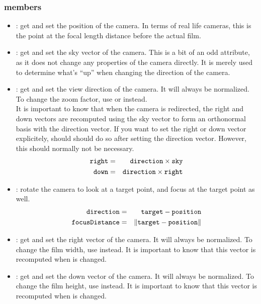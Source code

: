 \subsubsection*{members}
\begin{itemize}
	\item {}:
		get and set the position of the camera.  In terms of real life cameras, this is the point at the focal length distance before the actual film.
		
 	\item {}:
 	  get and set the sky vector of the camera.  This is a bit of an odd attribute, as it does not change any properties of the camera directly.  It is merely used to determine what's ``up'' when changing the direction of the camera.
 	  
	\item {}:
		get and set the view direction of the camera.  It will always be normalized.  To change the zoom factor, use  or  instead.\\
		It is important to know that when the camera is redirected, the right and down vectors are recomputed using the sky vector to form an orthonormal basis with the direction vector.  If you want to set the right or down vector explicitely, should should do so after setting the direction vector.  However, this should normally not be necessary.
	  \begin{eqnarray}
	  	\kw{right} &=& \kw{direction} \times \kw{sky}\\
	  	\kw{down} &=& \kw{direction} \times \kw{right}
	  \end{eqnarray}
	  
	\item {}:
	  rotate the camera to look at a target point, and focus at the target point as well.
	  \begin{eqnarray}
	  	\kw{direction} &=& \kw{target} - \kw{position}\\
	  	\kw{focusDistance} &=& \left\|\kw{target} - \kw{position}\right\|
	  \end{eqnarray}
		
 	\item {}:
 	  get and set the right vector of the camera.  It will always be normalized.  To change the film width, use  instead.  It is important to know that this vector is recomputed when  is changed.
		
 	\item {}:
 	  get and set the down vector of the camera.  It will always be normalized.  To change the film height, use  instead.  It is important to know that this vector is recomputed when  is changed.
		

\end{itemize}
